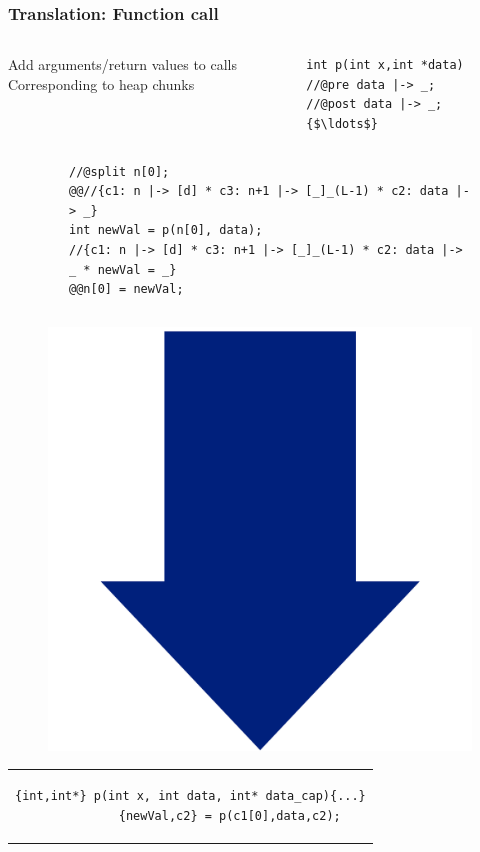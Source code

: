 \documentclass{beamer}
\begin{document}
\begin{frame}[fragile]
\frametitle{Translation: Function call}
\begin{columns}
\begin{column}{0.55\textwidth}
Add arguments/return values to calls\\
\quad Corresponding to heap chunks
\end{column}
\begin{column}{0.42\textwidth}
\begin{lstlisting}[style=CStyle, captionpos = t]
int p(int x,int *data)
//@pre data |-> _; 
//@post data |-> _;
{$\ldots$}
\end{lstlisting}
\end{column}
\end{columns}
\vspace{-1em}

\begin{columns}
\begin{column}{0.15\textwidth}
\end{column}
\begin{column}{0.90\textwidth}
\begin{figure}[h]
  \centering
\begin{lstlisting}[style=CStyleOverlay, captionpos = t, firstnumber = 11]
//@split n[0];
@@//{c1: n |-> [d] * c3: n+1 |-> [_]_(L-1) * c2: data |-> _}
int newVal = p(n[0], data);
//{c1: n |-> [d] * c3: n+1 |-> [_]_(L-1) * c2: data |-> _ * newVal = _}
@@n[0] = newVal;
\end{lstlisting}
\end{figure}
\end{column}
\end{columns}

\vspace{-.5em}
\begin{figure}[h]
\includegraphics[width=0.07\linewidth]{BlueArrowVertical}
\end{figure}
\vspace{-2em}

\begin{center}
\begin{tabular}{c}
\begin{lstlisting}[style=CStyleNoNum, captionpos = t]
{int,int*} p(int x, int data, int* data_cap){...}
           {newVal,c2} = p(c1[0],data,c2);
\end{lstlisting}
\end{tabular}
\end{center}

\end{frame}
\end{document}
